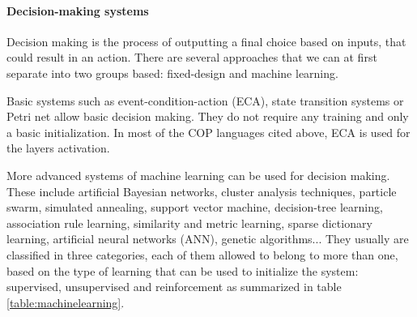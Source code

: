\documentclass[a4paper]{article}
\begin{document}
\paragraph{Decision-making systems}
Decision making is the process of outputting a final choice based on inputs, that could result in an action. There are several approaches that we can at first separate into two groups based: fixed-design and machine learning.

Basic systems such as event-condition-action (ECA), state transition systems or Petri net allow basic decision making. They do not require any training and only a basic initialization. In most of the COP languages cited above, ECA is used for the layers activation.

More advanced systems of machine learning can be used for decision making. These include artificial Bayesian networks, cluster analysis techniques, particle swarm, simulated annealing, support vector machine, decision-tree learning, association rule learning, similarity and metric learning, sparse dictionary learning, artificial neural networks (ANN), genetic algorithms... They usually are classified in three categories, each of them allowed to belong to more than one, based on the type of learning that can be used to initialize the system: supervised, unsupervised and reinforcement as summarized in table \ref{table:machinelearning}.
\end{document}
